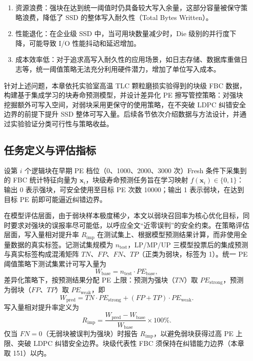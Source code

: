 \begin{enumerate}
    \item 资源浪费：强块在达到统一阈值时仍具备较大写入余量，这部分容量被保守策略浪费，降低了 SSD 的整体写入耐久性（Total Bytes Written）。
    \item 性能退化：在企业级 SSD 中，当可用块数量减少时，Die 级别的并行度下降，可能导致 I/O 性能抖动和延迟增加。
    \item 成本效率低：对于追求高写入耐久性的应用场景，如日志存储、数据库重做日志等，统一阈值策略无法充分利用硬件潜力，增加了单位写入成本。
\end{enumerate}

针对上述问题，本章依托实验室高温 TLC 颗粒磨损实验得到的块级 FBC 数据，构建基于集成学习的块寿命预测模型，并设计差异化 PE 擦写管控策略：对强块挖掘额外可写入空间，对弱块采用更保守的使用策略，在不突破 LDPC 纠错安全边界的前提下提升 SSD 整体可写入量。后续各节依次介绍数据与方法设计，并通过实验验证分类可行性与策略收益。

\subsection{任务定义与评估指标}

设第 $i$ 个逻辑块在早期 PE 档位（0、1000、2000、3000 次）Fresh 条件下采集到的 FBC 统计特征向量为 $\mathbf{x}_i$，块级寿命预测任务旨在学习映射 $f(\mathbf{x}_i) \in \{0,1\}$：输出 0 表示强块，可安全使用至目标 PE 次数 10000；输出 1 表示弱块，在达到目标 PE 前即可能逼近纠错边界。

在模型评估层面，由于弱块样本极度稀少，本文以弱块召回率为核心优化目标，同时要求对强块的误报率尽可能低，以呼应全文“近零误判”的安全约束。在策略评估层面，写入量相对提升率 $R_{\mathrm{imp}}$ 在测试集上、根据模型预测结果计算，而非使用全量数据的真实标签。记测试集规模为 $n_{\text{test}}$，LP/MP/UP 三模型投票后的集成预测与真实标签构成混淆矩阵 $TN$、$FP$、$FN$、$TP$（正类为弱块，标签为 1）。统一 PE 阈值策略下测试集累计可写入量为
\begin{equation}
    W_{\text{base}} = n_{\text{test}} \cdot PE_{\text{base}},
\end{equation}
差异化策略下，按预测结果分配 PE 上限：预测为强块（$TN$）取 $PE_{\text{strong}}$，预测为弱块（$FP$、$TP$）取 $PE_{\text{weak}}$，即
\begin{equation}
    W_{\text{pred}} = TN \cdot PE_{\text{strong}} + (FP + TP) \cdot PE_{\text{weak}}.
    \label{eq:wpred-test}
\end{equation}
写入量相对提升率定义为
\begin{equation}
    R_{\mathrm{imp}} = \frac{W_{\text{pred}} - W_{\text{base}}}{W_{\text{base}}} \times 100\%.
    \label{eq:rimp}
\end{equation}
仅当 $FN = 0$（无弱块被误判为强块）时报告 $R_{\mathrm{imp}}$，以避免弱块获得过高 PE 上限、突破 LDPC 纠错安全边界。块级代表性 FBC 须保持在纠错能力边界（本章取 151）以内。

